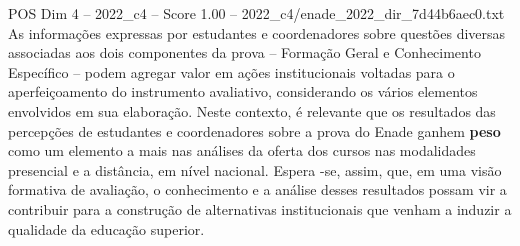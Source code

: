 \begin{textsample}{POS Dim 4 – 2022\_c4 – Score 1.00 – 2022\_c4/enade\_2022\_dir\_7d44b6aec0.txt}
As informações expressas por estudantes e coordenadores sobre questões diversas associadas aos dois componentes da prova – Formação Geral e Conhecimento Específico – podem agregar valor em ações institucionais voltadas para o aperfeiçoamento do instrumento avaliativo, considerando os vários elementos envolvidos em sua elaboração.
Neste contexto, é relevante que os resultados das percepções de estudantes e coordenadores sobre a prova do Enade ganhem \textbf{peso} como um elemento a mais nas análises da oferta dos cursos nas modalidades presencial e a distância, em nível nacional.
Espera -se, assim, que, em uma visão formativa de avaliação, o conhecimento e a análise desses resultados possam vir a contribuir para a construção de alternativas institucionais que venham a induzir a qualidade da educação superior.

\end{textsample}
